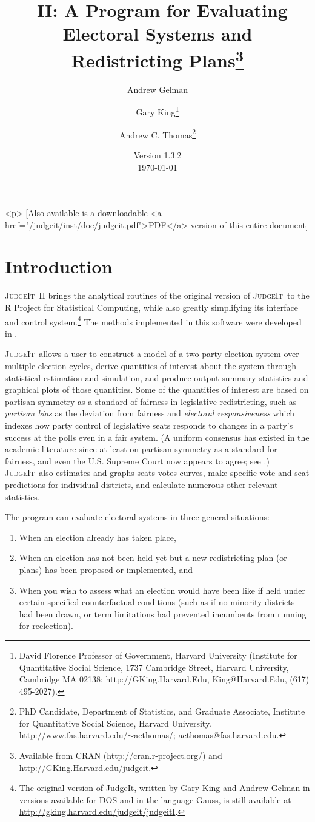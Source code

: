 \documentclass[oneside,letterpaper,titlepage]{article}
\title{\JudgeIt~II: A Program for Evaluating Electoral Systems and
  Redistricting Plans\thanks{Available from CRAN (http://cran.r-project.org/) and
    http://GKing.Harvard.edu/judgeit.}}
\author{Andrew Gelman \and Gary King\thanks{David Florence Professor
    of Government, Harvard University (Institute for Quantitative
    Social Science, 1737 Cambridge Street, Harvard University,
    Cambridge MA 02138; http://GKing.Harvard.Edu, King@Harvard.Edu,
    (617) 495-2027).}  \and %
	Andrew C. Thomas\thanks{PhD Candidate, Department of Statistics, and Graduate Associate, Institute for Quantitative Social Science, Harvard University. http://www.fas.harvard.edu/$\sim$acthomas/; acthomas@fas.harvard.edu.}}
\date{Version 1.3.2\\ \today}
\newcommand{\JudgeIt}{\textsc{JudgeIt}\ }
\begin{document}
\maketitle

\begin{rawhtml}
  <p> [Also available is a downloadable <a
  href="/judgeit/inst/doc/judgeit.pdf">PDF</a> version of this entire document]
\end{rawhtml}

\tableofcontents
\clearpage

\section{Introduction}

\JudgeIt II brings the analytical routines of the original version of \JudgeIt to the R Project for Statistical Computing, while also greatly simplifying its interface and control system.\footnote{The original version of JudgeIt, written by Gary King and Andrew Gelman in   versions available for DOS and in the language Gauss, is still available at \url{http://gking.harvard.edu/judgeit/judgeitI}.}  The methods implemented in this software were developed in \citet{GelKin90,GelKin90b,GelKin94a,GelKin94b,KinGel91,GelKatKin04}.

\JudgeIt allows a user to construct a model of a two-party election system over multiple election cycles, derive quantities of interest about the system through statistical estimation and simulation, and produce output summary statistics and graphical plots of those quantities.  Some of the quantities of interest are based on partisan symmetry as a standard of fairness in legislative redistricting, such as \emph{partisan bias} as the deviation from fairness and \emph{electoral responsiveness} which indexes how party control of legislative seats responds to changes in a party's success at the polls even in a fair system.  (A uniform consensus has existed in the academic literature since at least \citet{KinBro87} on partisan symmetry as a standard for fairness, and even the U.S. Supreme Court now appears to agree; see \citealt{GroKin07}.)  \JudgeIt also estimates and graphs seats-votes curves, make specific vote and seat predictions for individual districts, and calculate numerous other relevant statistics.

The program can evaluate electoral systems in three general situations:
\begin{enumerate}
\item When an election already has taken place,
\item When an election has not been held yet but a new redistricting plan (or plans) has been proposed or implemented, and
\item When you wish to assess what an election would have been like if held under certain specified counterfactual conditions (such as if no minority districts had been drawn, or term limitations had prevented incumbents from running for reelection).
\end{enumerate}
\end{document}
